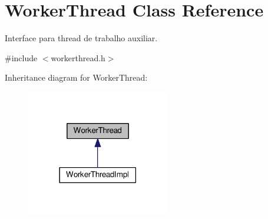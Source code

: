 \hypertarget{classWorkerThread}{}\section{Worker\+Thread Class Reference}
\label{classWorkerThread}


Interface para thread de trabalho auxiliar.  




{\ttfamily \#include $<$workerthread.\+h$>$}



Inheritance diagram for Worker\+Thread\+:
\nopagebreak
\begin{figure}[H]
\begin{center}
\leavevmode
\includegraphics[width=177pt]{d3/da8/classWorkerThread__inherit__graph}
\end{center}
\end{figure}
